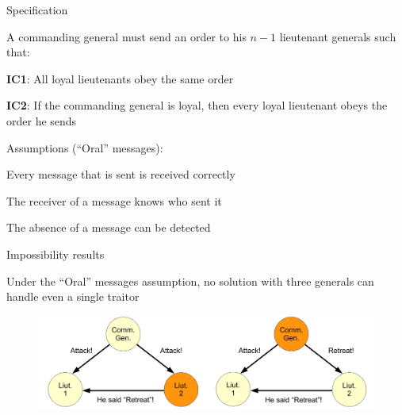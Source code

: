 \begin{frame}{Specification}

\BIL
\item A \alert{commanding general} must send an order to his $n-1$ \alert{lieutenant generals} such that:
\BI
\item \textbf{IC1}: All loyal lieutenants obey the same order
\item \textbf{IC2}: If the commanding general is loyal, then every loyal lieutenant obeys the order he sends
\EI
\item Assumptions (“Oral” messages):
\BI
\item Every message that is sent is received correctly
\item The receiver of a message knows who sent it
\item The absence of a message can be detected
\EI
\EIL

\end{frame}


\begin{frame}{Impossibility results}
	
Under the “Oral” messages assumption, no solution with three generals can handle even 
a single traitor
	
\begin{figure}
	\includegraphics[width=\textwidth]{impossibility}
\end{figure}

\end{frame}


